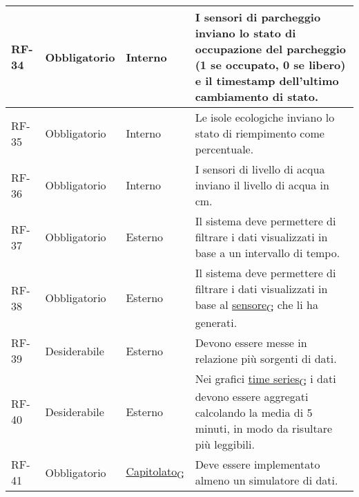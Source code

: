 \begin{longtable}{|>{\centering\arraybackslash}m{}|>{\centering\arraybackslash}m{}|>{\centering\arraybackslash}m{}|>{\centering\arraybackslash}m{}|}
	\\\hline
	RF-34           & Obbligatorio        & Interno                                                                                                           & I sensori di parcheggio inviano lo stato di occupazione del parcheggio (1 se occupato, 0 se libero) e il timestamp dell'ultimo cambiamento di stato.
	\\\hline
	RF-35           & Obbligatorio        & Interno                                                                                                           & Le isole ecologiche inviano lo stato di riempimento come percentuale.
	\\\hline
	RF-36           & Obbligatorio        & Interno                                                                                                           & I sensori di livello di acqua inviano il livello di acqua in cm.
	\\\hline
	RF-37           & Obbligatorio        & Esterno                                                                                                           & Il sistema deve permettere di filtrare i dati visualizzati in base a un intervallo di tempo.
	\\\hline
	RF-38           & Obbligatorio        & Esterno                                                                                                           & Il sistema deve permettere di filtrare i dati visualizzati in base al \href{https://7last.github.io/docs/pb/documentazione-interna/glossario\#sensore}{sensore\textsubscript{G}} che li ha generati.
	\\\hline
	RF-39           & Desiderabile        & Esterno                                                                                                           & Devono essere messe in relazione più sorgenti di dati.
	\\\hline
	RF-40           & Desiderabile        & Esterno                                                                                                           & Nei grafici \href{https://7last.github.io/docs/pb/documentazione-interna/glossario\#time-series}{time series\textsubscript{G}} i dati devono essere aggregati calcolando la media di 5 minuti, in modo da risultare più leggibili.
	\\\hline
	RF-41           & Obbligatorio        & \href{https://7last.github.io/docs/pb/documentazione-interna/glossario\#capitolato}{Capitolato\textsubscript{G}} & Deve essere implementato almeno un simulatore di dati.
	\\\hline

\end{longtable}
